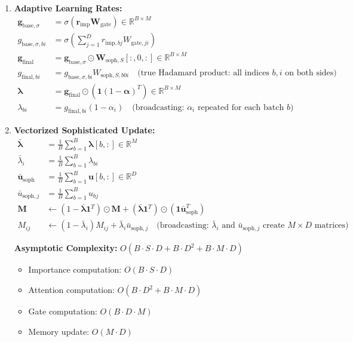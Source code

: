 \documentclass{article}
\begin{document}
\begin{enumerate}
\item \textbf{Adaptive Learning Rates:}
\begin{align}
\mathbf{g}_{\text{base},\sigma} &= \sigma(\mathbf{r}_{\text{imp}} \mathbf{W}_{\text{gate}}) \in \mathbb{R}^{B \times M} \\
g_{\text{base},\sigma,bi} &= \sigma\left(\sum_{j=1}^{D} r_{\text{imp},bj} W_{\text{gate},ji}\right) \\
\mathbf{g}_{\text{final}} &= \mathbf{g}_{\text{base},\sigma} \odot \mathbf{W}_{\text{soph},S}[:, 0, :] \in \mathbb{R}^{B \times M} \\
g_{\text{final},bi} &= g_{\text{base},\sigma,bi} W_{\text{soph},S,b0i} \quad \text{(true Hadamard product: all indices $b,i$ on both sides)} \\
\boldsymbol{\lambda} &= \mathbf{g}_{\text{final}} \odot (\mathbf{1} (1 - \boldsymbol{\alpha})^T) \in \mathbb{R}^{B \times M} \\
\lambda_{bi} &= g_{\text{final},bi} (1 - \alpha_i) \quad \text{(broadcasting: $\alpha_i$ repeated for each batch $b$)}
\end{align}

\item \textbf{Vectorized Sophisticated Update:}
\begin{align}
\bar{\boldsymbol{\lambda}} &= \frac{1}{B}\sum_{b=1}^{B} \boldsymbol{\lambda}[b, :] \in \mathbb{R}^{M} \\
\bar{\lambda}_i &= \frac{1}{B}\sum_{b=1}^{B} \lambda_{bi} \\
\bar{\mathbf{u}}_{\text{soph}} &= \frac{1}{B}\sum_{b=1}^{B} \mathbf{u}[b, :] \in \mathbb{R}^{D} \\
\bar{u}_{\text{soph},j} &= \frac{1}{B}\sum_{b=1}^{B} u_{bj} \\
\mathbf{M} &\leftarrow (1 - \bar{\boldsymbol{\lambda}} \mathbf{1}^T) \odot \mathbf{M} + (\bar{\boldsymbol{\lambda}} \mathbf{1}^T) \odot (\mathbf{1} \bar{\mathbf{u}}_{\text{soph}}^T) \\
M_{ij} &\leftarrow (1 - \bar{\lambda}_i) M_{ij} + \bar{\lambda}_i \bar{u}_{\text{soph},j} \quad \text{(broadcasting: $\bar{\lambda}_i$ and $\bar{u}_{\text{soph},j}$ create $M \times D$ matrices)}
\end{align}

\textbf{Asymptotic Complexity:} $O(B \cdot S \cdot D + B \cdot D^2 + B \cdot M \cdot D)$
\begin{itemize}
\item Importance computation: $O(B \cdot S \cdot D)$
\item Attention computation: $O(B \cdot D^2 + B \cdot M \cdot D)$
\item Gate computation: $O(B \cdot D \cdot M)$
\item Memory update: $O(M \cdot D)$
\end{itemize}


\end{enumerate}
\end{document}
